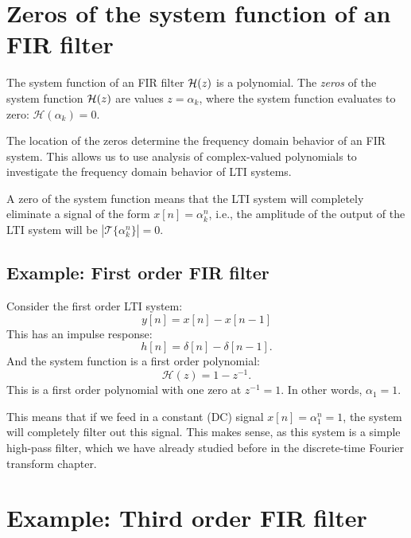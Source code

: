 \section{Zeros of the system function of an FIR filter}
The system function of an FIR filter $\mathcal{H}(z)$ is a polynomial. The
\emph{zeros} of the system function $\mathcal{H}(z)$ are values $z=\alpha_k$, where
the system function evaluates to zero: $\mathcal{H}(\alpha_k) = 0$.

The location of the zeros determine the frequency domain behavior of
an FIR system. This allows us to use analysis of complex-valued polynomials
to investigate the frequency domain behavior of LTI systems.

A zero of the system function means that the LTI system will
completely eliminate a signal of the form $x[n]=\alpha_k^{n}$, i.e.,
the amplitude of the output of the LTI system will be
$|\mathcal{T}\{\alpha_k^{n}\}|=0$.

\subsection{Example: First order FIR filter}

Consider the first order LTI system:
\begin{equation}
  y[n] = x[n] - x[n-1]
\end{equation}
This has an impulse response:
\begin{equation}
  h[n] = \delta[n] - \delta[n-1].
\end{equation}
And the system function is a first order polynomial:
\begin{equation}
  \mathcal{H}(z) = 1-z^{-1}.
\end{equation}
This is a first order polynomial with one zero at $z^{-1}=1$. In other
words, $\alpha_1=1$.

This means that if we feed in a constant (DC) signal $x[n]=\alpha_1^{n}=1$, the
system will completely filter out this signal. This makes sense, as
this system is a simple high-pass filter, which we have already
studied before in the discrete-time Fourier transform chapter. 

\section{Example: Third order FIR filter}

